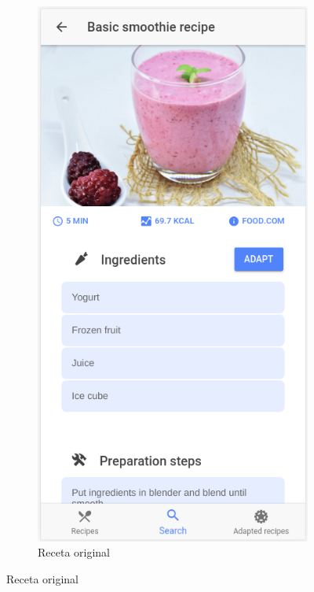 \begin{figure}[H]
    \centering
    \begin{subfigure}[b]{0.30\linewidth}
        \includegraphics[width=\linewidth]{imagenes/app/pantallas/ejemplo10.png}
        \caption{Receta original}
        \label{fig:ejemplo10}

\end{subfigure}
\end{figure}
